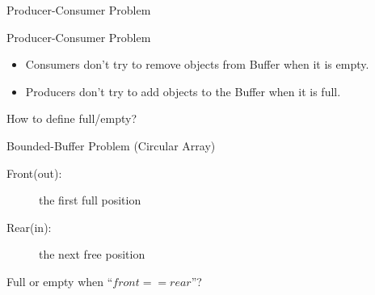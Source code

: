\begin{frame}{Producer-Consumer Problem}
  \centering
  \mode<beamer>{ \texttt{[image: ipc]} }%
\end{frame}

\begin{frame}{Producer-Consumer Problem}
  \begin{itemize}
  \item Consumers don't try to remove objects from Buffer when it is empty.
  \item Producers don't try to add objects to the Buffer when it is full.
  \end{itemize}
  \begin{center}
  \end{center}
  \begin{center}
    How to define \alert{full/empty}?
  \end{center}
\end{frame}

\begin{frame}{Bounded-Buffer Problem (Circular Array)}
  \begin{minipage}{.65\linewidth}
  \begin{description}
  \item[Front(out):] the first full position
  \item[Rear(in):] the next free position
  \end{description}
  \end{minipage}\quad
  \begin{minipage}{.3\linewidth}
  \end{minipage}
  Full or empty when ``$front == rear$''?
\end{frame}

